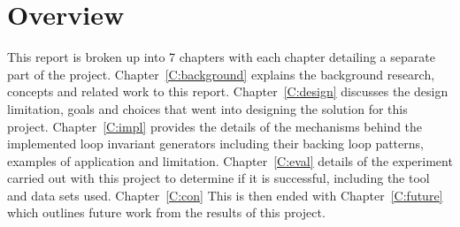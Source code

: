 \section{Overview}

This report is broken up into 7 chapters with each chapter detailing a separate part of the project.
Chapter~\ref{C:background} explains the background research, concepts and related work to this report.
Chapter~\ref{C:design} discusses the design limitation, goals and choices that went into designing the
solution for this project.
Chapter~\ref{C:impl} provides the details of the mechanisms behind the implemented 
loop invariant generators including their backing loop patterns, examples of application and limitation.
Chapter~\ref{C:eval} details of the experiment carried out with this project to determine if it is
successful, including the tool and data sets used. 
Chapter~\ref{C:con} 
This is then ended with Chapter~\ref{C:future} which outlines future work from the results of this project.
